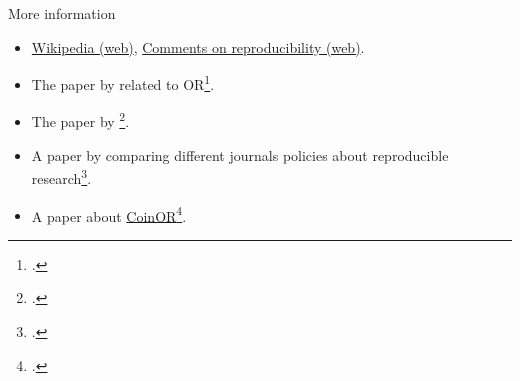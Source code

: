 \documentclass[10pt, compress]{beamer}
\begin{document}
\begin{frame}{More information}

\begin{itemize}
\item \href{http://en.wikipedia.org/wiki/Reproducibility}{Wikipedia (web)}, \href{http://kbroman.org/knitr_knutshell/pages/reproducible.html}{Comments on reproducibility (web)}.
\item The paper by \citeauthor{Nestler11} related to OR\footcite{Nestler11}.
\item The paper by \citeauthor{Peng09}\footcite{Peng09}.
\item A paper by \citeauthor{Stodden13} comparing different journals policies about reproducible research\footcite{Stodden13}.
\item A paper about \href{http://www.coin-or.org/}{CoinOR}\footcite{Lougee-Heimer03}.
\end{itemize}

\end{frame}
\end{document}
